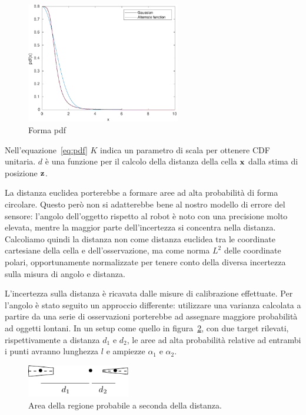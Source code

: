\documentclass[a4paper]{article}
\begin{document}
	\begin{figure}[H]
		\centering
		\includegraphics[width=0.6\textwidth]{./img/pdf_shape.pdf}
		\caption{Forma pdf}
		\label{fig:pdf_shape}
	\end{figure}

	Nell'equazione~\ref{eq:pdf} $K$ indica un parametro di scala per ottenere
	CDF unitaria. $d$ è una funzione per il calcolo della distanza della cella
	${\bf x}$ dalla stima di posizione ${\bf z}$.

	La distanza euclidea porterebbe a formare aree ad alta probabilità di forma
	circolare. Questo però non si adatterebbe bene al nostro modello di errore
	del sensore: l'angolo dell'oggetto rispetto al robot è noto con una
	precisione molto elevata, mentre la maggior parte dell'incertezza si
	concentra nella distanza. Calcoliamo quindi la distanza non come distanza
	euclidea tra le coordinate cartesiane della cella e dell'osservazione, ma
	come norma $L^2$ delle coordinate polari, opportunamente normalizzate per
	tenere conto della diversa incertezza sulla misura di angolo e distanza.

	L'incertezza sulla distanza è ricavata dalle misure di calibrazione
	effettuate. Per l'angolo è stato seguito un approccio differente:
	utilizzare una varianza calcolata a partire da una serie di osservazioni
	porterebbe ad assegnare maggiore probabilità ad oggetti lontani.  In un
	setup come quello in figura~\ref{fig:circular_sector}, con due target
	rilevati, rispettivamente a distanza $d_1$ e $d_2$, le aree ad alta
	probabilità relative ad entrambi i punti avranno lunghezza $l$ e ampiezze $
	\alpha_1 \text{ e } \alpha_2  $. 
	
	\begin{figure}[H]
		\centering
		\includegraphics[width=0.4\textwidth]{img/circular_sector.pdf}
		\caption{Area della regione probabile a seconda della distanza.}
		\label{fig:circular_sector}
	\end{figure}
\end{document}
